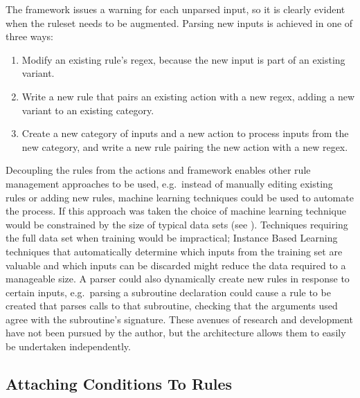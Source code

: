 The framework issues a warning for each unparsed input, so it is clearly
evident when the ruleset needs to be augmented.  Parsing new inputs is
achieved in one of three ways:

\begin{enumerate}

    \item Modify an existing rule's regex, because the new input is part of
        an existing variant.

    \item Write a new rule that pairs an existing action with a new regex,
        adding a new variant to an existing category.

    \item Create a new category of inputs and a new action to process
        inputs from the new category, and write a new rule pairing the new
        action with a new regex.

\end{enumerate}

Decoupling the rules from the actions and framework enables other rule
management approaches to be used, e.g.\ instead of manually editing
existing rules or adding new rules, machine learning techniques could be
used to automate the process.  If this approach was taken the choice of
machine learning technique would be constrained by the size of typical data
sets (see ).  Techniques requiring the full
data set when training would be impractical; Instance Based
Learning~\cite{instance-based-learning} techniques that automatically
determine which inputs from the training set are valuable and which inputs
can be discarded might reduce the data required to a manageable size.  A
parser could also dynamically create new rules in response to certain
inputs, e.g.\ parsing a subroutine declaration could cause a rule to be
created that parses calls to that subroutine, checking that the arguments
used agree with the subroutine's signature.  These avenues of research and
development have not been pursued by the author, but the architecture
allows them to easily be undertaken independently.

\subsection{Attaching Conditions To Rules}

\label{attaching conditions to rules}

